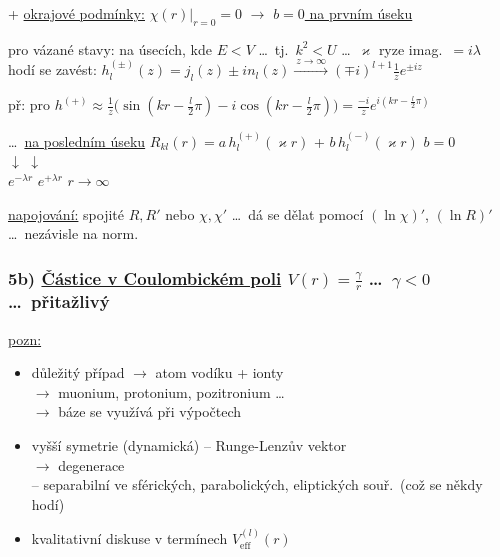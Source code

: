 + \underline{okrajové podmínky:} \quad $\chi(r)\big|_{r=0} = 0$ \quad $\to$ \quad \underline{$b = 0$ na prvním úseku}

pro vázané stavy: na úsecích, kde $E < V$ \dots\ tj.\ $k^2 < U$ \dots\ $\varkappa$ ryze imag.\ $= i\lambda$ \\
\quad hodí se zavést: \quad $h_l^{(\pm)}(z) = j_l(z) \pm in_l(z) \xrightarrow{\ z\to\infty\ } (\mp i)^{l+1}\frac1z e^{\pm iz}$

\quad př: pro $h^{(+)}\approx\frac1z\big(\sin(kr - \frac l2\pi) - i\cos(kr - \frac l2\pi)\big) = \frac{-i}{z}e^{i(kr - \frac l2\pi)}$

\quad \dots\ \underline{na posledním úseku} \quad $R_{kl}(r) = a\,h_l^{(+)}(\varkappa r)$ + \sout{$b\,h_l^{(-)}(\varkappa r)$} \hfill {\color{gray}$b = 0$} \\
\hspace*{6.6cm} $\downarrow$ \hspace*{1.7cm} $\downarrow$ \\
\hspace*{6.3cm} $e^{-\lambda r}$ \hspace*{1.4cm} $e^{+\lambda r}$ \qquad $r\to\infty$

\underline{napojování:} spojité $R, R'$ nebo $\chi,\chi'$ \dots\ dá se dělat pomocí $(\ln\chi)'$, $(\ln R)'$ \\
\hspace*{5.5cm} \dots\ nezávisle na norm.

\subsubsection*{5b) \underline{Částice v Coulombickém poli} \quad $V(r) = \frac{\gamma}{r}$ \dots\ $\gamma < 0$ \dots\ přitažlivý}
\hfill{}

\underline{pozn:}
\begin{itemize}[nosep]
  \item důležitý případ $\to$ atom vodíku + ionty \\
        \hspace*{2.75cm} $\to$ muonium, protonium, pozitronium \dots \\
        \hspace*{2.75cm} $\to$ báze se využívá při výpočtech
  \item vyšší symetrie (dynamická) -- Runge-Lenzův vektor \\
        $\to$  degenerace \\
        -- separabilní ve sférických, parabolických, eliptických souř.\ (což se někdy hodí)
  \item kvalitativní diskuse v termínech $V_{\text{eff}}^{(l)}(r)$
\end{itemize}

